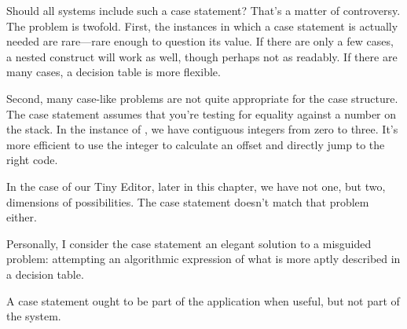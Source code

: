 Should all \Forth{} systems include such a case statement? That's a matter
of controversy. The problem is twofold. First, the instances in which a
case statement is actually needed are rare---rare enough to question its
value. If there are only a few cases, a nested  construct will work as well, though perhaps not as
readably. If there are many cases, a decision table is more flexible.

Second, many case-like problems are not quite appropriate for the case
structure. The  case statement assumes that you're testing
for equality against a number on the stack. In the instance of
, we have contiguous integers from zero to three. It's more
efficient to use the integer to calculate an offset and directly jump to
the right code.

In the case of our Tiny Editor, later in this chapter, we have not one, but
two, dimensions of possibilities. The case statement doesn't match that
problem either.

Personally, I consider the case statement an elegant solution to a
misguided problem: attempting an algorithmic expression of what is
more aptly described in a decision table.

A case statement ought to be part of the application when useful,
but not part of the system.%
%

